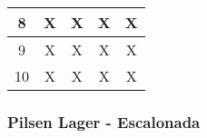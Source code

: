 \begin{minipage}{0.95\textwidth}
\begin{tabularx}{\textwidth}{|X|X|X|X|X|}
             \hline
             \multicolumn{1}{|c|}{8} & \multicolumn{1}{c|}{X}  & \multicolumn{1}{c|}{X} &\multicolumn{1}{c|}{X} &\multicolumn{1}{c|}{X} \\
             \hline
             \multicolumn{1}{|c|}{9} & \multicolumn{1}{c|}{X}  & \multicolumn{1}{c|}{X} &\multicolumn{1}{c|}{X} &\multicolumn{1}{c|}{X} \\
             \hline
             \multicolumn{1}{|c|}{10} & \multicolumn{1}{c|}{X} & \multicolumn{1}{c|}{X} &\multicolumn{1}{c|}{X} &\multicolumn{1}{c|}{X} \\
             \hline
        \end{tabularx}
        \label{tab:ResultadosPilsenSimple}
    \end{minipage}
    
 \subsubsection{Pilsen Lager - Escalonada}
    
